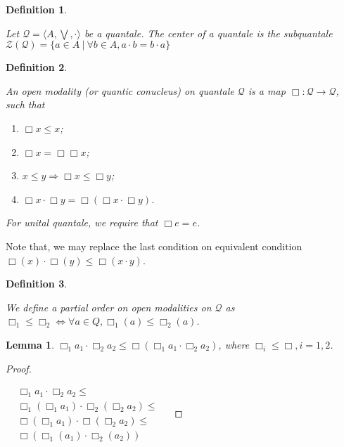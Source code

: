 \documentclass[a4paper]{article}
\theoremstyle{defin}
\newtheorem{defin}{Definition}
\theoremstyle{theorem}
\theoremstyle{prop}
\theoremstyle{lemma}
\newtheorem{lemma}{Lemma}
\theoremstyle{ex}
\theoremstyle{col}
\begin{document}
\begin{defin}
$ $

  Let $\mathcal{Q} = \langle A, \bigvee, \cdot \rangle$ be a quantale.
  The center of a quantale is the subquantale $\mathcal{Z}(\mathcal{Q}) = \{ a \in A \: | \: \forall b \in A, a \cdot b = b \cdot a \}$
\end{defin}

\begin{defin}
$ $

  An open modality (or quantic conucleus) on quantale $\mathcal{Q}$ is a map $\Box : \mathcal{Q} \to \mathcal{Q}$, such that

\begin{enumerate}
  \item $\Box x \leq x$;
  \item $\Box x = \Box \Box x$;
  \item $x \leq y \Rightarrow \Box x \leq \Box y$;
  \item $\Box x \cdot \Box y = \Box (\Box x \cdot \Box y)$.
\end{enumerate}

For unital quantale, we require that $\Box e = e$.
\end{defin}

Note that, we may replace the last condition on equivalent condition $\Box (x) \cdot \Box (y) \leq \Box (x \cdot y)$.

\begin{defin}
$ $

  We define a partial order on open modalities on $\mathcal{Q}$ as $\Box_1 \leq \Box_2 \Leftrightarrow \forall a \in Q, \Box_1 (a) \leq \Box_2 (a)$.
\end{defin}

\begin{lemma}
  $\Box_1 a_1 \cdot \Box_2 a_2 \leq \Box (\Box_1 a_1 \cdot \Box_2 a_2)$, where $\Box_i \leq \Box, i = 1,2$.
\end{lemma}

\begin{proof}
$ $

  $\begin{array}{lll}
  &\Box_1 a_1 \cdot \Box_2 a_2 \leq & \\
  &\Box_1 (\Box_1 a_1) \cdot \Box_2 (\Box_2 a_2) \leq & \\
  &\Box (\Box_1 a_1) \cdot \Box (\Box_2 a_2) \leq & \\
  &\Box (\Box_1 (a_1) \cdot \Box_2 (a_2))&
  \end{array}$
\end{proof}
\end{document}
